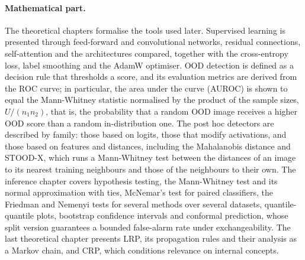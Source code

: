 \paragraph{Mathematical part.} The theoretical chapters formalise the tools used later. Supervised learning is presented through feed-forward and convolutional networks, residual connections, self-attention and the architectures compared, together with the cross-entropy loss, label smoothing and the AdamW optimiser. OOD detection is defined as a decision rule that thresholds a score, and its evaluation metrics are derived from the ROC curve; in particular, the area under the curve (AUROC) is shown to equal the Mann-Whitney statistic normalised by the product of the sample sizes, $U/(n_1 n_2)$, that is, the probability that a random OOD image receives a higher OOD score than a random in-distribution one. The post hoc detectors are described by family: those based on logits, those that modify activations, and those based on features and distances, including the Mahalanobis distance and STOOD-X, which runs a Mann-Whitney test between the distances of an image to its nearest training neighbours and those of the neighbours to their own. The inference chapter covers hypothesis testing, the Mann-Whitney test and its normal approximation with ties, McNemar's test for paired classifiers, the Friedman and Nemenyi tests for several methods over several datasets, quantile-quantile plots, bootstrap confidence intervals and conformal prediction, whose split version guarantees a bounded false-alarm rate under exchangeability. The last theoretical chapter presents LRP, its propagation rules and their analysis as a Markov chain, and CRP, which conditions relevance on internal concepts.

